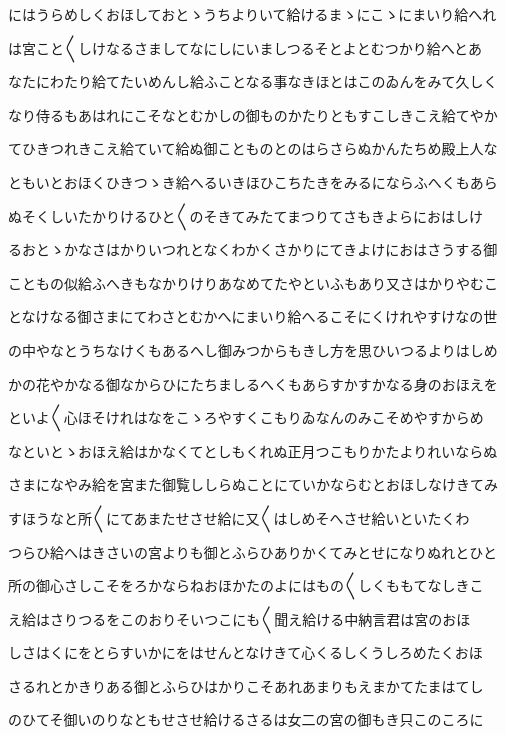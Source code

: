 \documentclass[a4paper,11pt,landscape]{ltjtarticle}
\begin{document}
にはうらめしくおほしておとゝうちよりいて給けるまゝにこゝにまいり給へれ
\par\medskip
は宮こと〱しけなるさましてなにしにいましつるそとよとむつかり給へとあ
\par\medskip
なたにわたり給てたいめんし給ふことなる事なきほとはこのゐんをみて久しく
\par\medskip
なり侍るもあはれにこそなとむかしの御ものかたりともすこしきこえ給てやか
\par\medskip
てひきつれきこえ給ていて給ぬ御ことものとのはらさらぬかんたちめ殿上人な
\par\medskip
ともいとおほくひきつゝき給へるいきほひこちたきをみるにならふへくもあら
\par\medskip
ぬそくしいたかりけるひと〱のそきてみたてまつりてさもきよらにおはしけ
\par\medskip
るおとゝかなさはかりいつれとなくわかくさかりにてきよけにおはさうする御
\par\medskip
こともの似給ふへきもなかりけりあなめてたやといふもあり又さはかりやむこ
\par\medskip
となけなる御さまにてわさとむかへにまいり給へるこそにくけれやすけなの世
\par\medskip
の中やなとうちなけくもあるへし御みつからもきし方を思ひいつるよりはしめ
\par\medskip
かの花やかなる御なからひにたちましるへくもあらすかすかなる身のおほえを
\par\medskip
といよ〱心ほそけれはなをこゝろやすくこもりゐなんのみこそめやすからめ
\par\medskip
なといとゝおほえ給はかなくてとしもくれぬ正月つこもりかたよりれいならぬ
\par\medskip
さまになやみ給を宮また御覧ししらぬことにていかならむとおほしなけきてみ
\par\medskip
すほうなと所〱にてあまたせさせ給に又〱はしめそへさせ給いといたくわ
\par\medskip
つらひ給へはきさいの宮よりも御とふらひありかくてみとせになりぬれとひと
\par\medskip
所の御心さしこそをろかならねおほかたのよにはもの〱しくももてなしきこ
\par\medskip
え給はさりつるをこのおりそいつこにも〱聞え給ける中納言君は宮のおほ
\par\medskip
しさはくにをとらすいかにをはせんとなけきて心くるしくうしろめたくおほ
\par\medskip
さるれとかきりある御とふらひはかりこそあれあまりもえまかてたまはてし
\par\medskip
のひてそ御いのりなともせさせ給けるさるは女二の宮の御もき只このころに
\end{document}
